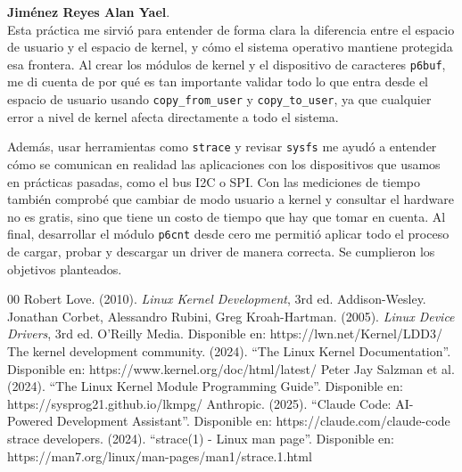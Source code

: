 \documentclass[conference]{IEEEtran}
\begin{document}
\textbf{Jiménez Reyes Alan Yael}. \\
Esta práctica me sirvió para entender de forma clara la diferencia entre el espacio de usuario y el espacio de kernel, y cómo el sistema operativo mantiene protegida esa frontera. Al crear los módulos de kernel y el dispositivo de caracteres \texttt{p6buf}, me di cuenta de por qué es tan importante validar todo lo que entra desde el espacio de usuario usando \texttt{copy\_from\_user} y \texttt{copy\_to\_user}, ya que cualquier error a nivel de kernel afecta directamente a todo el sistema.

Además, usar herramientas como \texttt{strace} y revisar \texttt{sysfs} me ayudó a entender cómo se comunican en realidad las aplicaciones con los dispositivos que usamos en prácticas pasadas, como el bus I2C o SPI. Con las mediciones de tiempo también comprobé que cambiar de modo usuario a kernel y consultar el hardware no es gratis, sino que tiene un costo de tiempo que hay que tomar en cuenta. Al final, desarrollar el módulo \texttt{p6cnt} desde cero me permitió aplicar todo el proceso de cargar, probar y descargar un driver de manera correcta. Se cumplieron los objetivos planteados.

\begin{thebibliography}{00}
	 Robert Love. (2010). \textit{Linux Kernel Development}, 3rd ed. Addison-Wesley.
	 Jonathan Corbet, Alessandro Rubini, Greg Kroah-Hartman. (2005). \textit{Linux Device Drivers}, 3rd ed. O'Reilly Media. Disponible en: https://lwn.net/Kernel/LDD3/
	 The kernel development community. (2024). ``The Linux Kernel Documentation''. Disponible en: https://www.kernel.org/doc/html/latest/
	 Peter Jay Salzman et al. (2024). ``The Linux Kernel Module Programming Guide''. Disponible en: https://sysprog21.github.io/lkmpg/
	 Anthropic. (2025). ``Claude Code: AI-Powered Development Assistant''. Disponible en: https://claude.com/claude-code
	 strace developers. (2024). ``strace(1) - Linux man page''. Disponible en: https://man7.org/linux/man-pages/man1/strace.1.html
\end{thebibliography}
\end{document}
